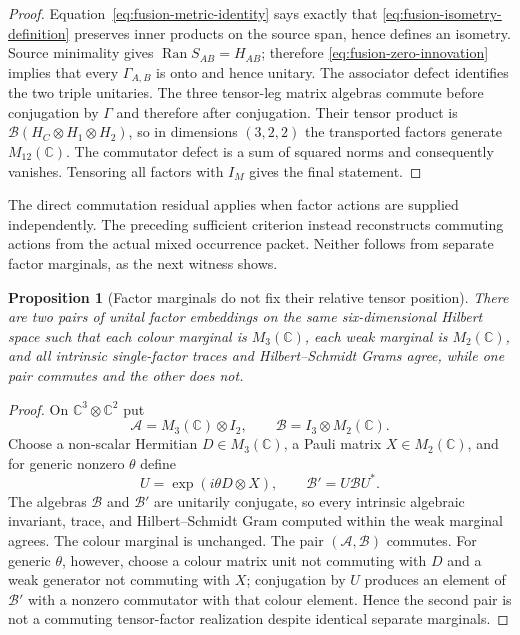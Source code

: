 \documentclass[11pt]{article}
\numberwithin{equation}{section}
\newtheorem{proposition}[theorem]{Proposition}
\theoremstyle{definition}
\theoremstyle{remark}
\newcommand{\C}{\mathbb C}
\newcommand{\Ran}{\operatorname{Ran}}
\begin{document}
\begin{proof}
Equation~\eqref{eq:fusion-metric-identity} says exactly that
\eqref{eq:fusion-isometry-definition} preserves inner products on the source
span, hence defines an isometry.  Source minimality gives
$\Ran S_{AB}=H_{AB}$; therefore
\eqref{eq:fusion-zero-innovation} implies that every $\Gamma_{A,B}$ is onto
and hence unitary.  The associator defect identifies the two triple unitaries.
The three tensor-leg matrix algebras commute before conjugation by $\Gamma$ and
therefore after conjugation.  Their tensor product is
$\mathcal B(H_C\otimes H_1\otimes H_2)$, so in dimensions $(3,2,2)$ the
transported factors generate $M_{12}(\C)$.  The commutator defect is a sum of
squared norms and consequently vanishes.  Tensoring all factors with $I_M$
gives the final statement.
\end{proof}

The direct commutation residual applies when factor actions are supplied
independently.  The preceding sufficient criterion instead reconstructs
commuting actions from the actual mixed occurrence packet.  Neither follows
from separate factor marginals, as the next witness shows.

\begin{proposition}[Factor marginals do not fix their relative tensor position]
\label{cth:factor-marginals-no-alignment}
There are two pairs of unital factor embeddings on the same six-dimensional
Hilbert space such that each colour marginal is $M_3(\C)$, each weak marginal
is $M_2(\C)$, and all intrinsic single-factor traces and Hilbert--Schmidt Grams
agree, while one pair commutes and the other does not.
\end{proposition}

\begin{proof}
On $\C^3\otimes\C^2$ put
\[
\mathcal A=M_3(\C)\otimes I_2,
\qquad
\mathcal B=I_3\otimes M_2(\C).
\]
Choose a non-scalar Hermitian $D\in M_3(\C)$, a Pauli matrix
$X\in M_2(\C)$, and for generic nonzero $\theta$ define
\[
U=\exp(i\theta D\otimes X),
\qquad
\mathcal B'=U\mathcal B U^*.
\]
The algebras $\mathcal B$ and $\mathcal B'$ are unitarily conjugate, so every
intrinsic algebraic invariant, trace, and Hilbert--Schmidt Gram computed within
the weak marginal agrees.  The colour marginal is unchanged.  The pair
$(\mathcal A,\mathcal B)$ commutes.  For generic $\theta$, however, choose a
colour matrix unit not commuting with $D$ and a weak generator not commuting
with $X$; conjugation by $U$ produces an element of $\mathcal B'$ with a
nonzero commutator with that colour element.  Hence the second pair is not a
commuting tensor-factor realization despite identical separate marginals.
\end{proof}
\end{document}
